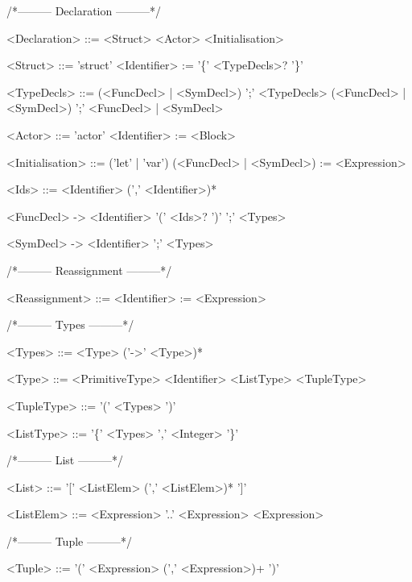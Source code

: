 /*--------- Declaration ---------*/
\begin{grammar}
<Declaration> ::= <Struct>
 \alt <Actor>
 \alt <Initialisation>

<Struct> ::= 'struct' <Identifier> := '\{' <TypeDecls>? '\}'

<TypeDecls> ::= (<FuncDecl> | <SymDecl>) ';' <TypeDecls>
 \alt (<FuncDecl> | <SymDecl>) ';'
 \alt <FuncDecl> | <SymDecl>

<Actor> ::= 'actor' <Identifier> := <Block>

<Initialisation> ::= ('let' | 'var') (<FuncDecl> | <SymDecl>) := <Expression>

<Ids> ::= <Identifier> (',' <Identifier>)*

<FuncDecl> -> <Identifier> '(' <Ids>? ')' ';' <Types>

<SymDecl> -> <Identifier> ';' <Types>
\end{grammar}
/*--------- Reassignment ---------*/
\begin{grammar}
<Reassignment> ::= <Identifier> := <Expression>
\end{grammar}
/*--------- Types ---------*/
\begin{grammar}
<Types> ::= <Type> ('->' <Type>)*

<Type> ::= <PrimitiveType>
 \alt <Identifier>
 \alt <ListType>
 \alt <TupleType>

<TupleType> ::= '(' <Types> ')'

<ListType> ::= '\{' <Types> ',' <Integer> '\}'
\end{grammar}
/*--------- List ---------*/
\begin{grammar}
<List> ::= '[' <ListElem> (',' <ListElem>)* ']'

<ListElem> ::= <Expression> '..' <Expression>
 \alt <Expression>
\end{grammar}
/*--------- Tuple ---------*/
\begin{grammar}
<Tuple> ::= '(' <Expression> (',' <Expression>)+ ')'
\end{grammar}